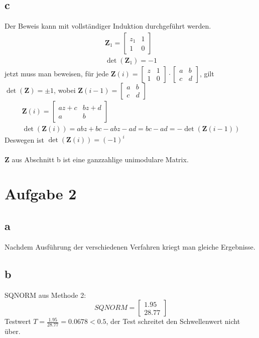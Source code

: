 \subsection{c}
Der Beweis kann mit vollständiger Induktion durchgeführt werden.
\begin{gather*}
	\bm{Z}_1 = \begin{bmatrix}
		z_1 & 1 \\
		1 & 0
	\end{bmatrix}\\
\det(\bm{Z}_1) = -1
\end{gather*}
jetzt muss man beweisen, für jede $\bm{Z}(i) = \begin{bmatrix}
	z & 1\\
	1 & 0
\end{bmatrix} \cdot \begin{bmatrix}
a & b \\
c & d
\end{bmatrix}$, gilt $\det(\bm{Z}) = \pm 1$, wobei $\bm{Z}(i-1) = \begin{bmatrix}
a & b\\
c & d
\end{bmatrix}$
\begin{gather*}
	\bm{Z}(i) = \begin{bmatrix}
		az + c & bz + d \\
		a & b
	\end{bmatrix} \\
\det(\bm{Z}(i)) = abz + bc - abz - ad = bc - ad = -\det(\bm{Z}(i-1))
\end{gather*}
Deswegen ist $\det(\bm{Z}(i)) = (-1)^{i}$\\\\
$\bm{Z}$ aus Abschnitt b ist eine ganzzahlige unimodulare Matrix.
\clearpage

\section{Aufgabe 2}
\subsection{a}
Nachdem Ausführung der verschiedenen Verfahren kriegt man gleiche Ergebnisse.
\subsection{b}
SQNORM aus Methode 2:
\begin{equation*}
	SQNORM = \begin{bmatrix}
		1.95 \\
		28.77
	\end{bmatrix}
\end{equation*}
Testwert $T = \tfrac{1.95}{28.77} = 0.0678 < 0.5$, der Test schreitet den Schwellenwert nicht über.

